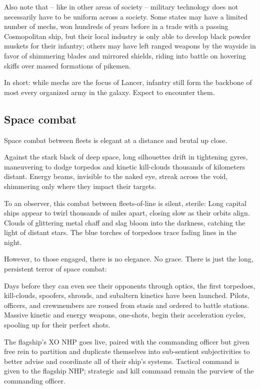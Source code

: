 Also note that -- like in other areas of society -- military technology does not necessarily have to
be uniform across a society. Some states may have a limited number of mechs, won hundreds of
years before in a trade with a passing Cosmopolitan ship, but their local industry is only able to
develop black powder muskets for their infantry; others may have left ranged weapons by the
wayside in favor of shimmering blades and mirrored shields, riding into battle on hovering skiffs
over massed formations of pikemen.

In short: while mechs are the focus of Lancer, infantry still form the backbone of most every
organized army in the galaxy. Expect to encounter them.

\subsection{Space combat}

Space combat between fleets is elegant at a distance and brutal up close.

Against the stark black of deep space, long silhouettes drift in tightening gyres, maneuvering to
dodge torpedos and kinetic kill-clouds thousands of kilometers distant. Energy beams, invisible
to the naked eye, streak across the void, shimmering only where they impact their targets.

To an observer, this combat between fleets-of-line is silent, sterile: Long capital ships appear to
twirl thousands of miles apart, closing slow as their orbits align. Clouds of glittering metal chaff
and slag bloom into the darkness, catching the light of distant stars. The blue torches of
torpedoes trace fading lines in the night.

However, to those engaged, there is no elegance. No grace. There is just the long, persistent
terror of space combat:

Days before they can even see their opponents through optics, the first torpedoes, kill-clouds,
spoofers, shrouds, and subaltern kinetics have been launched. Pilots, officers, and
crewmembers are roused from stasis and ordered to battle stations. Massive kinetic and energy
weapons, one-shots, begin their acceleration cycles, spooling up for their perfect shots.

The flagship's XO NHP goes live, paired with the commanding officer but given free rein to
partition and duplicate themselves into sub-sentient subjectivities to better advise and
coordinate all of their ship's systems. Tactical command is given to the flagship NHP; strategic
and kill command remain the purview of the commanding officer.

